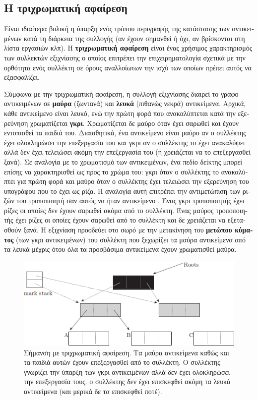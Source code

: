 \begin{greek}
\section{Η τριχρωματική αφαίρεση}
Είναι ιδιαίτερα βολική η ύπαρξη ενός τρόπου περιγραφής της
κατάστασης των αντικειμένων κατά τη διάρκεια της συλλογής
(αν έχουν σημανθεί ή όχι, αν βρίσκονται στη λίστα εργασιών
κλπ). Η \textbf{τριχρωματική αφαίρεση}  είναι ένας χρήσιμος χαρακτηρισμός
των συλλεκτών εξιχνίασης ο οποίος επιτρέπει την 
επιχειρηματολογία σχετικά με την ορθότητα ενός συλλέκτη
σε όρους αναλλοίωτων την ισχύ των οποίων πρέπει αυτός να
εξασφαλίζει. 

Σύμφωνα με την τριχρωματική αφαίρεση, η συλλογή εξιχνίασης
διαιρεί το γράφο αντικειμένων σε \textbf{μαύρα} (ζωντανά) 
και \textbf{λευκά} (πιθανώς νεκρά) αντικείμενα. Αρχικά, κάθε
αντικείμενο είναι λευκό, ενώ την πρώτη φορά που ανακαλύπτεται
κατά την εξερεύνηση χρωματίζεται \textbf{γκρι}. Χρωματίζεται
δε μαύρο όταν έχει σαρωθεί και έχουν εντοπισθεί τα παιδιά του.
Διαισθητικά, ένα αντικείμενο είναι μαύρο αν ο συλλέκτης έχει
ολοκληρώσει την επεξεργασία του και γκρι αν ο συλλέκτης το
έχει ανακαλύψει αλλά δεν έχει τελειώσει ακόμη την επεξεργασία
του (ή χρειάζεται να το επεξεργασθεί ξανά). Σε αναλογία με
το χρωματισμό των αντικειμένων, ένα πεδίο δείκτης μπορεί 
επίσης να χαρακτηρισθεί ως προς το χρώμα του: γκρι όταν ο
συλλέκτης το ανακαλύπτει για πρώτη φορά και μαύρο όταν ο
συλλέκτης έχει τελειώσει την εξερεύνηση του υπογράφου που
το έχει ως ρίζα.  Η αναλογία αυτή επιτρέπει την αντιμετώπιση
των ριζών του τροποποιητή σαν αυτός να ήταν αντικείμενο
\cite{DBLP:conf/iwmm/Pirinen98}. Ένας γκρι τροποποιητής έχει
ρίζες οι οποίες δεν έχουν σαρωθεί ακόμα από το συλλέκτη. 
Ένας μαύρος τροποποιητής έχει ρίζες οι οποίες έχουν σαρωθεί
από το συλλέκτη και δε χρειάζεται να εξετασθούν ξανά. Η
εξιχνίαση προοδεύει στο σωρό με την μετακίνηση του
\textbf{μετώπου κύματος} (των γκρι αντικειμένων)
του συλλέκτη που ξεχωρίζει τα μαύρα αντικείμενα από τα
λευκά μέχρις ότου όλα τα προσβάσιμα αντικείμενα έχουν
χρωματισθεί μαύρα.

\begin{figure}
  \centering
  \includegraphics{figures/mrkswp_1}
  \caption[Σήμανση με τριχρωματική αφαίρεση]
    {Σήμανση με τριχρωματική αφαίρεση. Τα μαύρα αντικείμενα καθώς
     και τα παιδιά αυτών έχουν επεξεργασθεί από το συλλέκτη. Ο
     συλλέκτης γνωρίζει την ύπαρξη των γκρι αντικειμένων αλλά
     δεν έχει ολοκληρώσει την επεξεργασία τους. ο συλλέκτης δεν
     έχει επισκεφθεί ακόμη τα λευκά αντικείμενα (και μερικά δε
     τα επισκεφθεί ποτέ).}
  \label{fig:mrkswp_1}
\end{figure}


\end{greek}
